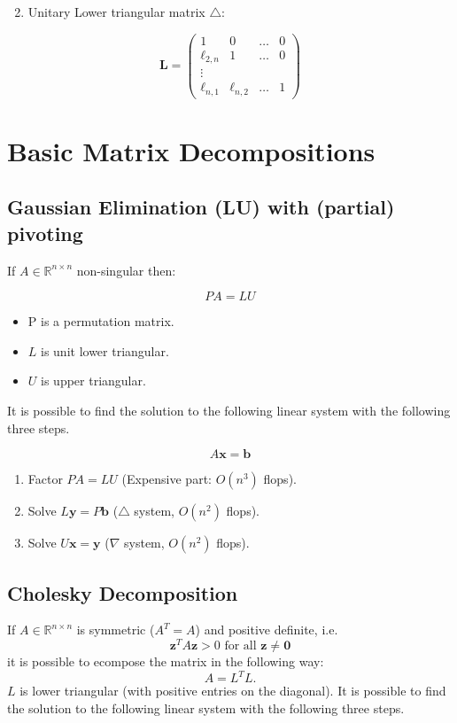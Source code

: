 \documentclass[11pt]{book}
\begin{document}
\begin{enumerate}
  \setcounter{enumi}{1}
  \item Unitary Lower triangular matrix $\triangle$:
\end{enumerate}

$$
\mathbf{L}=\left(\begin{array}{cccc}
1 & 0 & \ldots & 0 \\
\ell_{2, n} & 1 & \ldots & 0 \\
\vdots & & & \\
\ell_{n, 1} & \ell_{n, 2} & \ldots & 1
\end{array}\right)
$$

\section*{Basic Matrix Decompositions}
\subsection*{Gaussian Elimination (LU) with (partial) pivoting}
If $A \in \mathbb{R}^{n \times n}$ non-singular then:

$$
P A=L U
$$

\begin{itemize}
  \item $\mathrm{P}$ is a permutation matrix.

  \item $L$ is unit lower triangular.

  \item $U$ is upper triangular.

\end{itemize}
It is possible to find the solution to the following linear system  with the following three steps.

$$
A \mathbf{x}=\mathbf{b}
$$

\begin{enumerate}
  \item Factor $P A=L U$ (Expensive part: $O\left(n^{3}\right)$ flops).

  \item Solve $L \mathbf{y}=P \mathbf{b}$ ($\triangle$ system, $O\left(n^{2}\right)$ flops).

  \item Solve $U \mathbf{x}=\mathbf{y}$ ($\nabla$ system, $O\left(n^{2}\right)$ flops).

\end{enumerate}

\subsection*{Cholesky Decomposition}
If $A \in \mathbb{R}^{n \times n}$ is symmetric ($A^{T}=A$) and positive definite, i.e.
$$
\mathbf{z}^{T} A \mathbf{z}>0 \text { for all } \mathbf{z} \neq \mathbf{0}
$$
it is possible to ecompose the matrix in the following way:
$$
A=L^{T} L.
$$
$L$ is lower triangular (with positive entries on the diagonal).
It is possible to find the solution to the following linear system  with the following three steps.
\end{document}
